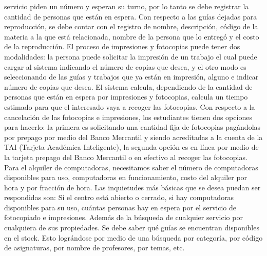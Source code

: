 \documentclass[12pt,a4paper,spanish]{article}
\begin{document}
servicio piden un n\'umero y esperan su turno, por lo tanto se debe
registrar la cantidad de personas que est\'an en espera. 
\newline
\newline
\indent Con respecto a las gu\'ias dejadas para reproducci\'on, se debe contar
con el registro de nombre, descripci\'on, c\'odigo de la materia a la que est\'a
relacionada, nombre de la persona que lo entreg\'o y el costo de la
reproducci\'on. El proceso de impresiones y fotocopias puede tener dos
modalidades: la persona puede solicitar la impresi\'on de un trabajo
el cual puede cargar al sistema  indicando el n\'umero de copias que
desea, y el otro modo es seleccionando de las gu\'ias y trabajos que
ya est\'an en impresi\'on, alguno e indicar n\'umero de copias que
desea. El sistema calcula, dependiendo de la cantidad de personas que
est\'an en espera por impresiones y fotocopias, calcula un tiempo
estimado para que el interesado vaya a recoger las fotocopias.
\newline
\newline
\indent Con respecto a la cancelaci\'on de las fotocopias e
impresiones, los estudiantes tienen dos opciones para hacerlo: la
primera es solicitando una cantidad fija de fotocopias pag\'andolas
por prepago por medio del Banco Mercantil y siendo acreditadas a la
cuenta de la TAI (Tarjeta Acad\'emica Inteligente), la segunda opci\'on
es en l\'inea por medio de la tarjeta prepago del Banco Mercantil o en
efectivo al recoger las fotocopias.
\newline
\newline
\indent Para el alquiler de computadoras, necesitamos saber el
n\'umero de computadoras disponibles para uso, computadoras en
funcionamiento, costo del alquiler por hora y por fracci\'on de hora. 
\newline
\newline
\indent Las inquietudes m\'as b\'asicas que se desea puedan ser respondidas
son: Si el centro est\'a abierto o cerrado, si hay computadoras
disponibles para su uso, cu\'antas personas hay en espera por el
servicio de fotocopiado e impresiones. Adem\'as de la b\'usqueda de
cualquier servicio por cualquiera de sus propiedades.
\newline
\newline
\indent Se debe saber qu\'e gu\'ias se encuentran disponibles en el stock. 
Esto logr\'andose por medio de una b\'usqueda por categor\'ia, por c\'odigo de
asignaturas, por nombre de profesores, por temas, etc.
\newline
\end{document}
